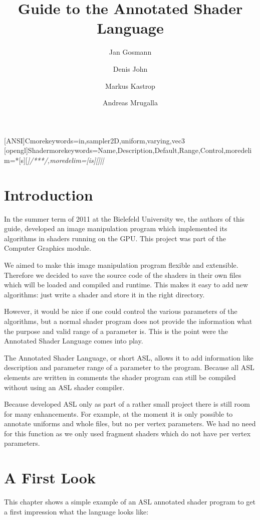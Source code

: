 \documentclass[11pt,a4paper]{scrreprt}
\title{Guide to the Annotated Shader Language}
\author{Jan Gosmann \and Denis John \and Markus Kastrop \and Andreas Mrugalla}
\begin{document}
[ANSI]{C}{morekeywords={in,sampler2D,uniform,varying,vec3}}
[opengl]{Shader}{morekeywords={Name,Description,Default,Range,Control},moredelim=*[s][\itshape]{/**}{*/},moredelim=[is][\itshape]{|}{|}}
\maketitle
\tableofcontents

\chapter{Introduction}
In the summer term of 2011 at the Bielefeld University we, the authors of this 
guide, developed an image manipulation program which implemented its algorithms 
in shaders running on the GPU. This project was part of the Computer Graphics 
module.

We aimed to make this image manipulation program flexible and extensible.  
Therefore we decided to save the source code of the shaders in their own files 
which will be loaded and compiled and runtime. This makes it easy to add new 
algorithms: just write a shader and store it in the right directory.

However, it would be nice if one could control the various parameters of the 
algorithms, but a normal shader program does not provide the information what 
the purpose and valid range of a parameter is. This is the point were the 
Annotated Shader Language comes into play.

The Annotated Shader Language, or short ASL, allows it to add information like 
description and parameter range of a parameter to the program. Because all ASL 
elements are written in comments the shader program can still be compiled 
without using an ASL shader compiler.

Because developed ASL only as part of a rather small project there is still room 
for many enhancements. For example, at the moment it is only possible to 
annotate uniforms and whole files, but no per vertex parameters. We had no need 
for this function as we only used fragment shaders which do not have per vertex 
parameters.


\chapter{A First Look}
This chapter shows a simple example of an ASL annotated shader program to get 
a first impression what the language looks like:
\end{document}
